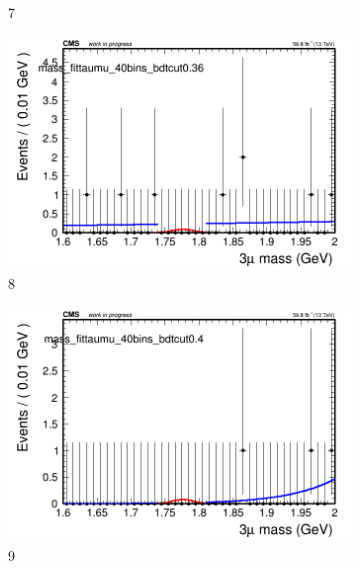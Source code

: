 \begin{figure}[h!]
\begin{subfigure}{0.2\textwidth}
        \caption{7}
    \end{subfigure}
    \begin{subfigure}{0.2\textwidth}
        \includegraphics[width=\textwidth]{power_law/plots/taumu/massfit_taumu_40bins_bdtcut0.36.png}
        \caption{8}
    \end{subfigure}
    \begin{subfigure}{0.2\textwidth}
        \includegraphics[width=\textwidth]{power_law/plots/taumu/massfit_taumu_40bins_bdtcut0.4.png}
        \caption{9}
    \end{subfigure}
    \begin{subfigure}{0.2\textwidth}

\end{subfigure}
\end{figure}
